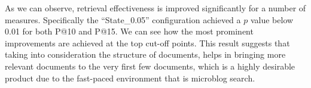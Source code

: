As we can observe, retrieval effectiveness is improved significantly for a number of measures. Specifically the ``State\_0.05'' configuration achieved a \(p\) value below 0.01 for both P@10 and P@15. We can see how the most prominent improvements are achieved at the top cut-off points. This result suggests that taking into consideration the structure of documents, helps in bringing more relevant documents to the very first few documents, which is a highly desirable product due to the fast-paced environment that is microblog search.



%
%
%
